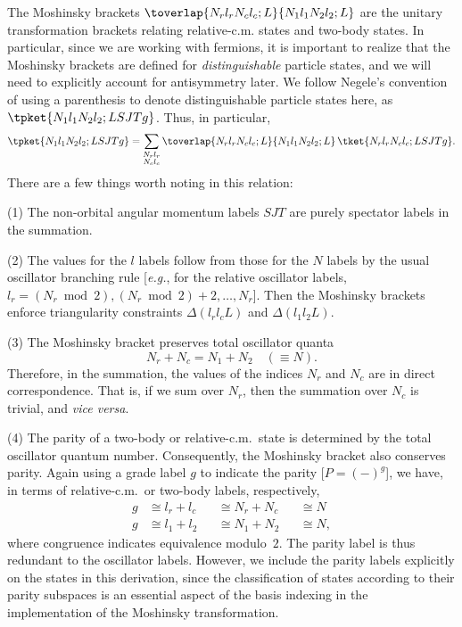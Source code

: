 \documentclass[aps,groupedaddress,onecolumn,11pt,floatfix]{revtex4}
\newcommand{\Nr}{N_r}
\newcommand{\Nc}{N_c}
\newcommand{\lr}{l_r}
\newcommand{\lc}{l_c}
\begin{document}
The Moshinsky brackets $\toverlap{\Nr\lr\Nc\lc;L}{N_1l_1N_2l_2;L}$ are
the unitary transformation brackets relating relative-c.m. states and two-body
states.  In particular, since we are working with fermions, it is
important to realize that the Moshinsky brackets are defined for
\textit{distinguishable} particle states, and we will need to
explicitly account for antisymmetry later.  We follow Negele's
convention of using a parenthesis to denote distinguishable particle
states here, as $\tpket{N_1 l_1 N_2 l_2;LSJTg}$.  Thus, in particular,
\begin{equation}
\label{eqn-moshinsky-xform-ket-dist}
\tpket{N_1 l_1 N_2 l_2;LSJTg}
=\sum_{\substack{\Nr\lr\\\Nc\lc}}
\toverlap{\Nr\lr\Nc\lc;L}{N_1l_1N_2l_2;L}
\,
\tket{\Nr \lr \Nc \lc;LSJTg}.
\end{equation}
There are a few things worth noting in this relation:

(1) The non-orbital angular momentum labels $SJT$ are purely spectator
labels in the summation.

(2) The values for the $l$ labels follow from those for the $N$ labels
by the usual oscillator branching rule [\textit{e.g.}, for the
  relative oscillator labels, $\lr= (\Nr \bmod 2), (\Nr
  \bmod 2)+2,\ldots,\Nr$].  Then the
Moshinsky brackets enforce triangularity constraints $\Delta(\lr\lc L)$
and $\Delta(l_1l_2L)$.

(3) The Moshinsky bracket
preserves total
oscillator quanta
\begin{equation}
\Nr+\Nc = N_1 + N_2 \quad(\equiv N).
\end{equation}
Therefore, in the summation, the values of the indices $\Nr$ and $\Nc$
are in direct correspondence.  That is, if we sum over $\Nr$, then the
summation over $\Nc$ is trivial, and \textit{vice versa}.

(4) The parity of a two-body or relative-c.m.~state is determined by
the total oscillator quantum number.  Consequently, the Moshinsky
bracket also conserves parity.  Again using a grade label $g$ to indicate the parity
[$P=(-)^g$], we have, in terms of relative-c.m.~or two-body labels, respectively,
\begin{equation}
\begin{aligned}
g&\cong \lr + \lc &&\cong \Nr+\Nc &&\cong N\\
g&\cong l_1 + l_2 &&\cong N_1+N_2 &&\cong N,
\end{aligned}
\end{equation}
where congruence indicates equivalence modulo~$2$.  The parity label
is thus redundant to the oscillator labels.  However, we include the
parity labels explicitly on the states in this derivation, since the
classification of states according to their parity subspaces is an
essential aspect of the basis indexing in the implementation of the
Moshinsky transformation.
\end{document}

